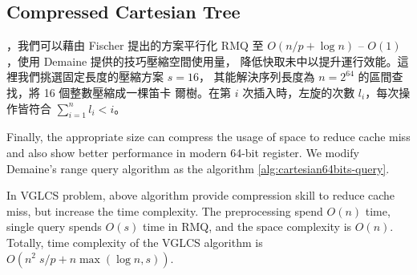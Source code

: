 \subsection{Compressed Cartesian Tree}

\iffalse 在 Fischer \cite{fischer} 的論文中，根據卡塔蘭數
$\frac{1}{s+1}\binom{2s}{s} = O(\frac{4^s}{s^{1.5}})$ 建立查找表
(lookup-table)，其中選擇 $s = \frac{1}{4} \log n$ 時，空間複雜度
$O(s^2 \frac{4^s}{s^{1.5}}) = o(n)$ 且建表複雜度 $o(n)$。每一個區間詢
問將會拆成 2 個 super-block 和 2 個 in-block 詢問，共計需要 4 次的記憶
體存取。在理論分析上，離線 RMQ 問題可在 $\theta(n)$ -- $\theta(1)$ 時
間內解決任一詢問。當 $n$ 越大時，這 4 次的記憶體存取會遭遇到嚴重的快取
未中 (cache miss)，在 Demaine ~\cite{demaine} 的論文中，發展出快取忘卻
(cache oblivious) 形式的查找方案，降低在離線版本中的 in-block 詢問產生
的快取未中。\fi


，我們可以藉由 Fischer 提出的方案平行化 RMQ 至
$O(n / p + \log n)$ -- $O(1)$，使用 Demaine 提供的技巧壓縮空間使用量，
降低快取未中以提升運行效能。這裡我們挑選固定長度的壓縮方案 $s = 16$，
其能解決序列長度為 $n = 2^{64}$ 的區間查找，將 16 個整數壓縮成一棵笛卡
爾樹。在第 $i$ 次插入時，左旋的次數 $l_i$，每次操作皆符合
$\sum_{i=1}^{n} l_i < i$。\fi





Finally, the appropriate size can compress the usage of space to
reduce cache miss and also show better performance in modern 64-bit
register.  We modify Demaine's range query algorithm as the algorithm
\ref{alg:cartesian64bits-query}.



\iffalse
因所有 $l_i < 16$，使得每個 $l_i$ 可用 4-bit 表示之，
整體便可用 64-bit 長整數表示一棵笛卡爾樹的狀態。
為了現在常見的 64-byte 快取列 (cache line) 和 64-bit 暫存器 (register) 考量，
我們選用合適的大小進行測試，不僅壓縮空間使用量，同時也減少快取未中的問題。
最後，我們得到壓縮算法 \ref{alg:cartesian-to-64bits}，其相對應的區間查找算法，
根據 Demaine \cite{demaine} 進行修改，得到壓縮下的詢問算法 \ref{alg:cartesian64bits-query}。
\fi

In VGLCS problem, above algorithm provide compression skill to reduce
cache miss, but increase the time complexity.  The preprocessing spend
$O(n)$ time, single query spends $O(s)$ time in RMQ, and the space
complexity is  $O(n)$.  Totally, time complexity of the VGLCS algorithm
is $O(n^2 \; s / p + n \max(\log n, s))$.

\iffalse
回到 VGLCS 的應用中，上述算法使用壓縮方式降低快取未中。
我們可以使用上述的算法取代原先的并查集，建表的時間複雜度為 $O(n)$，
單一查詢的時間複雜度為 $O(s)$。
整體的時間複雜度為 $O(n^2 \; s / p + n \max(\log n, s))$。
\fi
